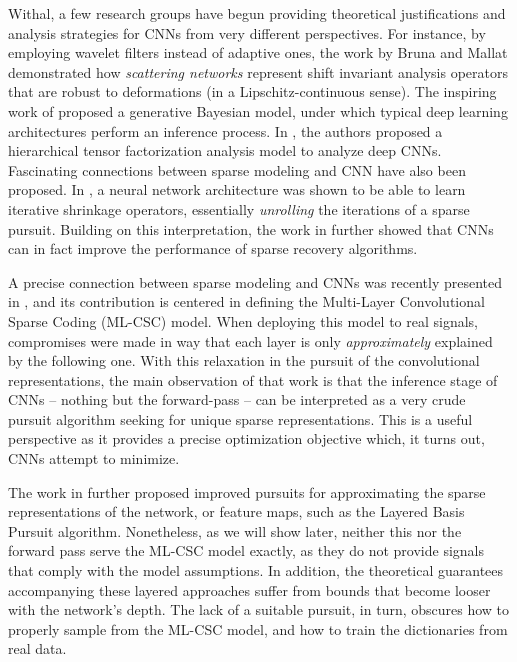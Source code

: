 \documentclass[10pt,journal]{IEEEtran}
\theoremstyle{plain}
\theoremstyle{definition}
\begin{document}
Withal, a few research groups have begun providing theoretical justifications and analysis strategies for CNNs from very different perspectives. For instance, by employing wavelet filters instead of adaptive ones, the work by Bruna and Mallat \cite{bruna2013invariant} demonstrated how \emph{scattering networks} represent shift invariant analysis operators that are robust to deformations (in a Lipschitz-continuous sense). The inspiring work of \cite{patel2015probabilistic} proposed a generative Bayesian model, under which typical deep learning architectures perform an inference process. In \cite{cohen16Shashua}, the authors proposed a hierarchical tensor factorization analysis model to analyze deep CNNs. Fascinating connections between sparse modeling and CNN have also been proposed. In \cite{gregor2010learning}, a neural network architecture was shown to be able to learn iterative shrinkage operators, essentially \emph{unrolling} the iterations of a sparse pursuit. Building on this interpretation, the work in \cite{xin2016maximal} further showed that CNNs can in fact improve the performance of sparse recovery algorithms. 

A precise connection between sparse modeling and CNNs was recently presented in \cite{Papyan2016convolutional}, and its contribution is centered in defining the Multi-Layer Convolutional Sparse Coding (ML-CSC) model. When deploying this model to real signals, compromises were made in way that each layer is only \emph{approximately} explained by the following one. With this relaxation in the pursuit of the convolutional representations, the main observation of that work is that the inference stage of CNNs -- nothing but the forward-pass -- can be interpreted as a very crude pursuit algorithm seeking for unique sparse representations. This is a useful perspective as it provides a precise optimization objective which, it turns out, CNNs attempt to minimize.  

The work in \cite{Papyan2016convolutional} further proposed improved pursuits for approximating the sparse representations of the network, or feature maps, such as the Layered Basis Pursuit algorithm. Nonetheless, as we will show later, neither this nor the forward pass serve the ML-CSC model exactly, as they do not provide signals that comply with the model assumptions. In addition, the theoretical guarantees accompanying these layered approaches suffer from bounds that become looser with the network's depth. The lack of a suitable pursuit, in turn, obscures how to properly sample from the ML-CSC model, and how to train the dictionaries from real data.
\end{document}
